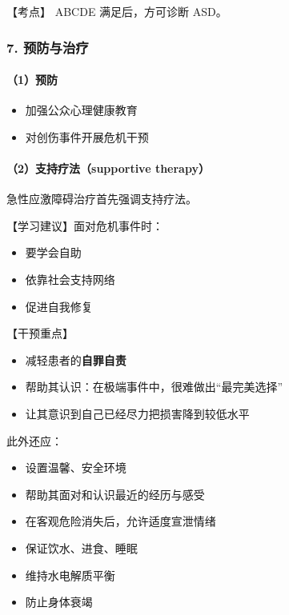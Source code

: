 \documentclass[
  chinese,
  9pt,
  a4paper,
]{ctexart}
\providecommand{\tightlist}{%
  \setlength{\itemsep}{0pt}\setlength{\parskip}{0pt}}
\begin{document}
【考点】 ABCDE 满足后，方可诊断 ASD。

\subsubsection{7. 预防与治疗}\label{ux9884ux9632ux4e0eux6cbbux7597}

\paragraph{（1）预防}\label{ux9884ux9632}

\begin{itemize}
\tightlist
\item
  加强公众心理健康教育
\item
  对创伤事件开展危机干预
\end{itemize}

\paragraph{（2）支持疗法（supportive
therapy）}\label{ux652fux6301ux7597ux6cd5supportive-therapy}

急性应激障碍治疗首先强调支持疗法。

【学习建议】面对危机事件时：

\begin{itemize}
\tightlist
\item
  要学会自助
\item
  依靠社会支持网络
\item
  促进自我修复
\end{itemize}

【干预重点】

\begin{itemize}
\tightlist
\item
  减轻患者的\textbf{自罪自责}
\item
  帮助其认识：在极端事件中，很难做出``最完美选择''
\item
  让其意识到自己已经尽力把损害降到较低水平
\end{itemize}

此外还应：

\begin{itemize}
\tightlist
\item
  设置温馨、安全环境
\item
  帮助其面对和认识最近的经历与感受
\item
  在客观危险消失后，允许适度宣泄情绪
\item
  保证饮水、进食、睡眠
\item
  维持水电解质平衡
\item
  防止身体衰竭
\end{itemize}
\end{document}
